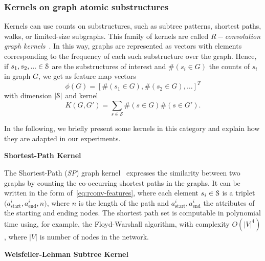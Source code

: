 \subsubsection{Kernels on graph atomic substructures}

Kernels can use counts on substructures, such as subtree patterns, shortest paths, walks, or limited-size subgraphs.
This family of kernels are called \emph{$R-$convolution graph kernels}~\citep{haussler}.
In this way, graphs are represented as vectors with elements corresponding to the frequency of each such substructure over the graph.
Hence, if
$ s_1, s_2, ... \in \mathcal{S}$ are the substructures of interest and $ \#\left(s_i \in G\right)$ the counts of $ s_i $ in graph $ G $, we get as feature map vectors
\[ 
\phi(G) = \left[\#\left(s_1 \in G\right), \#\left(s_2 \in G\right), \dots\right]^T
\label{eq:rconv-features}
\]
with dimension $ |\mathcal{S}| $  and kernel
\[
K(G, G') = \sum_{s \in \mathcal{S}} \#\left(s \in G\right) \#\left(s \in G'\right).
\]

In the following, we briefly present some kernels in this category and explain how they are adapted in our experiments.

\vspace{1em}
\noindent\textbf{Shortest-Path Kernel}

The Shortest-Path (\emph{SP}) graph kernel~\citep{borgwardt2005} expresses the similarity between two graphs by counting the co-occurring shortest paths in the graphs.
It can be written in the form of~\cref{eq:rconv-features}, where each element $ s_i \in \mathcal{S} $ is a triplet $\big(a_{\text{start}}^i, a_{\text{end}}^i, n\big)$, where $ n $ is the length of the path and $ a_{\text{start}}^i, a_{\text{end}}^i $ the attributes of the starting and ending nodes.
The shortest path set is computable in polynomial time using, for example, the Floyd-Warshall algorithm, with complexity $ O(|V|^4)$, where $ |V| $ is number of nodes in the network.

\vspace{1em}
\noindent\textbf{Weisfeiler-Lehman Subtree Kernel}

